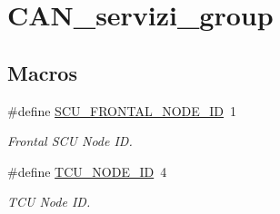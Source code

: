\hypertarget{group___c_a_n__servizi__group}{\section{C\-A\-N\-\_\-servizi\-\_\-group}
\label{group___c_a_n__servizi__group}
}
\subsection*{Macros}
\begin{DoxyCompactItemize}
\item 
\hypertarget{group___c_a_n__servizi__group_ga8d64b6b4c0f02ebded5440c6250e03b9}{\#define \hyperlink{group___c_a_n__servizi__group_ga8d64b6b4c0f02ebded5440c6250e03b9}{S\-C\-U\-\_\-\-F\-R\-O\-N\-T\-A\-L\-\_\-\-N\-O\-D\-E\-\_\-\-I\-D}~1}\label{group___c_a_n__servizi__group_ga8d64b6b4c0f02ebded5440c6250e03b9}

\begin{DoxyCompactList}\small\item\em Frontal S\-C\-U Node I\-D. \end{DoxyCompactList}\item 
\hypertarget{group___c_a_n__servizi__group_gaceef3f7366b39e88d89cb98ad8094c7b}{\#define \hyperlink{group___c_a_n__servizi__group_gaceef3f7366b39e88d89cb98ad8094c7b}{T\-C\-U\-\_\-\-N\-O\-D\-E\-\_\-\-I\-D}~4}\label{group___c_a_n__servizi__group_gaceef3f7366b39e88d89cb98ad8094c7b}

\begin{DoxyCompactList}\small\item\em T\-C\-U Node I\-D. \end{DoxyCompactList}\end{DoxyCompactItemize}

